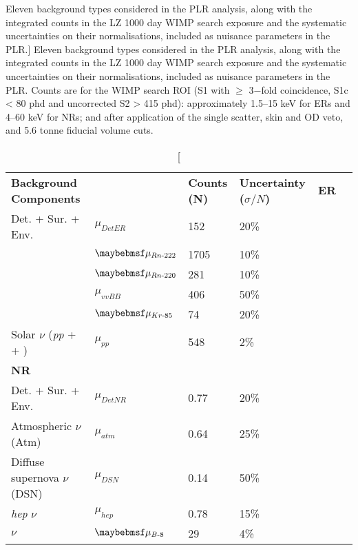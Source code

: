 \begin{table}[t!]
\centering
\caption
[Eleven background types considered in the PLR analysis, along with the integrated counts in the LZ 1000 day WIMP search exposure and the systematic uncertainties on their normalisations, included as nuisance parameters in the PLR.]
{Eleven background types considered in the PLR analysis, along with the integrated counts in the LZ 1000 day WIMP search exposure and the systematic uncertainties on their normalisations, included as nuisance parameters in the PLR. Counts are for the WIMP search ROI (S1 with $\geq$ 3−fold coincidence, S1c < 80 phd and uncorrected S2 > 415 phd): approximately 1.5–15 keV for ERs and 4–60 keV for NRs; and after application of the single scatter, skin and OD veto, and 5.6 tonne fiducial volume cuts.}
\label{tab:lz_pdf_estimations}
\vspace{1mm}
\renewcommand{\arraystretch}{1.2}
    \begin{tabularx}{0.9\linewidth}{@{\extracolsep{\fill}}llll}
    \toprule
    \textbf{Background Components} & %
    \textbf{} & %
    \textbf{Counts (N)} & %
    \textbf{Uncertainty ($\sigma/N$)} & %
    \hline
    \hline
    \textbf{ER}    &      &      \\
    Det. + Sur. + Env. & $\mu_{DetER}$ & 152 & 20\% \\
    \RnTTT{} & $\mu_{Rn\MathText{-}222}$ & 1705 & 10\% \\
    \RnTTZ{} & $\mu_{Rn\MathText{-}220}$ & 281 & 10\% \\
    \XeOTS{} \twoNeutrinoDoubleBeta{} & $\mu_{vvBB}$ & 406 & 50\% \\
    \KrEF{} & $\mu_{Kr\MathText{-}85}$ & 74 & 20\% \\
    Solar $\nu$ (\textit{pp} + \BeS{} + \NOT{}) & $\mu_{pp}$ & 548 & 2\% \\
    \textbf{NR}    &      &      \\
    Det. + Sur. + Env. & $\mu_{DetNR}$ & 0.77 & 20\% \\
    Atmospheric $\nu$ (Atm)  & $\mu_{atm}$ & 0.64 & 25\% \\
    Diffuse supernova $\nu$ (DSN) & $\mu_{DSN}$ & 0.14 & 50\% \\
    \textit{hep} $\nu$ & $\mu_{hep}$ & 0.78 & 15\% \\
    \BE{} $\nu$ & $\mu_{B\MathText{-}8}$ & 29 & 4\% \\
    
    \bottomrule
    \end{tabularx}
\end{table}